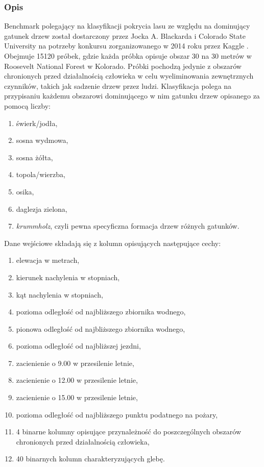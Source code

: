 \documentclass{article}
\begin{document}
\subsubsection{Opis}
Benchmark polegający na klasyfikacji pokrycia lasu ze względu na dominujący gatunek drzew został dostarczony przez Jocka A. Blackarda i Colorado State University na potrzeby konkursu zorganizowanego w 2014 roku przez Kaggle \cite{forest_cover}. Obejmuje 15120 próbek, gdzie każda próbka opisuje obszar 30 na 30 metrów w Roosevelt National Forest w Kolorado. Próbki pochodzą jedynie z obszarów chronionych przed działalnością człowieka w celu wyeliminowania zewnętrznych czynników, takich jak sadzenie drzew przez ludzi. Klasyfikacja polega na przypisaniu każdemu obszarowi dominującego w nim gatunku drzew opisanego za pomocą liczby:
\begin{enumerate}
\item świerk/jodła,
\item sosna wydmowa,
\item sosna żółta,
\item topola/wierzba,
\item osika,
\item daglezja zielona,
\item \textit{krummholz}, czyli pewna specyficzna formacja drzew różnych gatunków.
\end{enumerate}
Dane wejściowe składają się z kolumn opisujących następujące cechy:
\begin{enumerate}
\item elewacja w metrach,
\item kierunek nachylenia w stopniach,
\item kąt nachylenia w stopniach,
\item pozioma odległość od najbliższego zbiornika wodnego,
\item pionowa odległość od najbliższego zbiornika wodnego,
\item pozioma odległość od najbliższej jezdni,
\item zacienienie o 9.00 w przesilenie letnie,
\item zacienienie o 12.00 w przesilenie letnie,
\item zacienienie o 15.00 w przesilenie letnie,
\item pozioma odległość od najbliższego punktu podatnego na pożary,
\item 4 binarne kolumny opisujące przynależność do poszczególnych obszarów chronionych przed działalnością człowieka,
\item 40 binarnych kolumn charakteryzujących glebę.
\end{enumerate}
\end{document}
